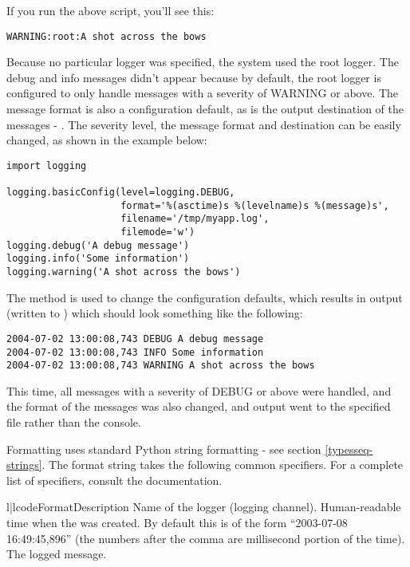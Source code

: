 If you run the above script, you'll see this:
\begin{verbatim}
WARNING:root:A shot across the bows
\end{verbatim}

Because no particular logger was specified, the system used the root logger.
The debug and info messages didn't appear because by default, the root
logger is configured to only handle messages with a severity of WARNING
or above. The message format is also a configuration default, as is the output
destination of the messages - . The severity level,
the message format and destination can be easily changed, as shown in
the example below:

\begin{verbatim}
import logging

logging.basicConfig(level=logging.DEBUG,
                    format='%(asctime)s %(levelname)s %(message)s',
                    filename='/tmp/myapp.log',
                    filemode='w')
logging.debug('A debug message')
logging.info('Some information')
logging.warning('A shot across the bows')
\end{verbatim}

The  method is used to change the configuration
defaults, which results in output (written to )
which should look something like the following:

\begin{verbatim}
2004-07-02 13:00:08,743 DEBUG A debug message
2004-07-02 13:00:08,743 INFO Some information
2004-07-02 13:00:08,743 WARNING A shot across the bows
\end{verbatim}

This time, all messages with a severity of DEBUG or above were handled,
and the format of the messages was also changed, and output went to the
specified file rather than the console.

Formatting uses standard Python string formatting - see section
\ref{typesseq-strings}. The format string takes the following
common specifiers. For a complete list of specifiers, consult the
 documentation.

\begin{tableii}{l|l}{code}{Format}{Description}
     {Name of the logger (logging channel).}
  {Human-readable time when the 
                        was created.  By default this is of the form
                        ``2003-07-08 16:49:45,896'' (the numbers after the
                        comma are millisecond portion of the time).}
  {The logged message.}
\end{tableii}

